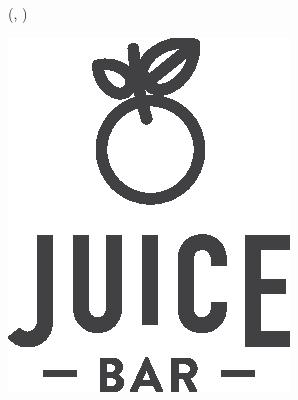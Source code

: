 
\begin{textblock*}{\Wii}(\StartX -1.6cm, \StartY -5.85cm) %
  \noindent
  {%
    \begin{minipage}[c][\Hii - 2\fboxsep][c]{\linewidth - 2\fboxsep}%
      \centering%
\includegraphics[width=\linewidth]{pics/logo.eps}\par
    \end{minipage}}%
\end{textblock*} %


